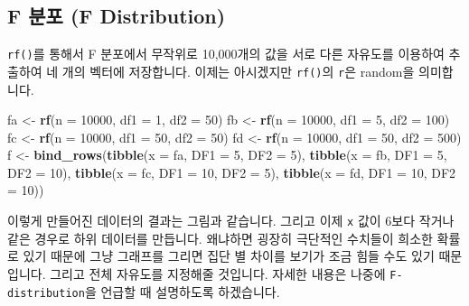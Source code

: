 \documentclass[]{book}
\newenvironment{Shaded}{\begin{snugshade}}{\end{snugshade}}
\newcommand{\DataTypeTok}[1]{\textcolor[rgb]{0.13,0.29,0.53}{#1}}
\newcommand{\DecValTok}[1]{\textcolor[rgb]{0.00,0.00,0.81}{#1}}
\newcommand{\KeywordTok}[1]{\textcolor[rgb]{0.13,0.29,0.53}{\textbf{#1}}}
\newcommand{\NormalTok}[1]{#1}
\newcommand{\StringTok}[1]{\textcolor[rgb]{0.31,0.60,0.02}{#1}}
\begin{document}
\hypertarget{f-uxbd84uxd3ec-f-distribution}{%
\subsection{F 분포 (F Distribution)}\label{f-uxbd84uxd3ec-f-distribution}}

\texttt{rf()}를 통해서 F 분포에서 무작위로 10,000개의 값을 서로 다른 자유도를 이용하여 추출하여 네 개의 벡터에 저장합니다. 이제는 아시겠지만 \texttt{rf()}의 \texttt{r}은 random을 의미합니다.

\begin{Shaded}
\begin{Highlighting}[]
\NormalTok{fa <-}\StringTok{ }\KeywordTok{rf}\NormalTok{(}\DataTypeTok{n =} \DecValTok{10000}\NormalTok{, }\DataTypeTok{df1 =} \DecValTok{1}\NormalTok{, }\DataTypeTok{df2 =} \DecValTok{50}\NormalTok{)}
\NormalTok{fb <-}\StringTok{ }\KeywordTok{rf}\NormalTok{(}\DataTypeTok{n =} \DecValTok{10000}\NormalTok{, }\DataTypeTok{df1 =} \DecValTok{5}\NormalTok{, }\DataTypeTok{df2 =} \DecValTok{100}\NormalTok{)}
\NormalTok{fc <-}\StringTok{ }\KeywordTok{rf}\NormalTok{(}\DataTypeTok{n =} \DecValTok{10000}\NormalTok{, }\DataTypeTok{df1 =} \DecValTok{50}\NormalTok{, }\DataTypeTok{df2 =} \DecValTok{50}\NormalTok{)}
\NormalTok{fd <-}\StringTok{ }\KeywordTok{rf}\NormalTok{(}\DataTypeTok{n =} \DecValTok{10000}\NormalTok{, }\DataTypeTok{df1 =} \DecValTok{50}\NormalTok{, }\DataTypeTok{df2 =} \DecValTok{500}\NormalTok{)}
\NormalTok{f <-}\StringTok{ }\KeywordTok{bind_rows}\NormalTok{(}\KeywordTok{tibble}\NormalTok{(}\DataTypeTok{x =}\NormalTok{ fa, }\DataTypeTok{DF1 =} \DecValTok{5}\NormalTok{, }\DataTypeTok{DF2 =} \DecValTok{5}\NormalTok{), }
               \KeywordTok{tibble}\NormalTok{(}\DataTypeTok{x =}\NormalTok{ fb, }\DataTypeTok{DF1 =} \DecValTok{5}\NormalTok{, }\DataTypeTok{DF2 =} \DecValTok{10}\NormalTok{), }
               \KeywordTok{tibble}\NormalTok{(}\DataTypeTok{x =}\NormalTok{ fc, }\DataTypeTok{DF1 =} \DecValTok{10}\NormalTok{, }\DataTypeTok{DF2 =} \DecValTok{5}\NormalTok{),}
               \KeywordTok{tibble}\NormalTok{(}\DataTypeTok{x =}\NormalTok{ fd, }\DataTypeTok{DF1 =} \DecValTok{10}\NormalTok{, }\DataTypeTok{DF2 =} \DecValTok{10}\NormalTok{))}
\end{Highlighting}
\end{Shaded}

이렇게 만들어진 데이터의 결과는 그림과 같습니다. 그리고 이제 \texttt{x} 값이 6보다 작거나 같은 경우로 하위 데이터를 만듭니다. 왜냐하면 굉장히 극단적인 수치들이 희소한 확률로 있기 때문에 그냥 그래프를 그리면 집단 별 차이를 보기가 조금 힘들 수도 있기 때문입니다. 그리고 전체 자유도를 지정해줄 것입니다. 자세한 내용은 나중에 \texttt{F-distribution}을 언급할 때 설명하도록 하겠습니다.
\end{document}
